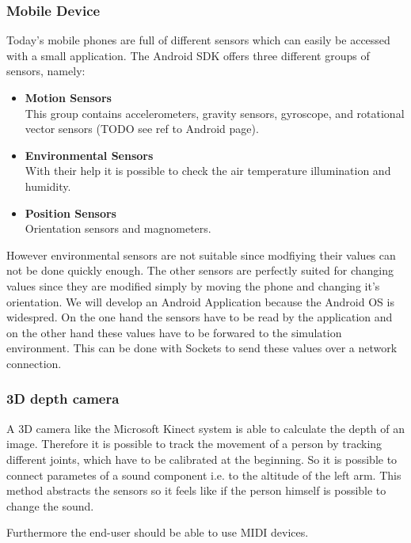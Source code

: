 \subsubsection{Mobile Device}
Today's mobile phones are full of different sensors which can easily be accessed with a small application. The Android SDK offers three different groups of sensors, namely:
\begin{itemize}
	\item \textbf{Motion Sensors} \\
			This group contains accelerometers, gravity sensors, gyroscope, and rotational vector sensors (TODO see ref to Android page). 
	\item \textbf{Environmental Sensors} \\
			With their help it is possible to check the air temperature illumination and humidity.
	\item \textbf{Position Sensors} \\
			Orientation sensors and magnometers.
\end{itemize}

However environmental sensors are not suitable since modfiying their values can not be done quickly enough. The other sensors are perfectly suited for changing values since they are modified simply by moving the phone and changing it's orientation. We will develop an Android Application because the Android OS is widespred. On the one hand the sensors have to be read by the application and on the other hand these values have to be forwared to the simulation environment. This can be done with Sockets to send these values over a network connection.

\subsubsection{3D depth camera}
A 3D camera like the Microsoft Kinect system is able to calculate the depth of an image. Therefore it is possible to track the movement of a person by tracking different joints, which have to be calibrated at the beginning. So it is possible to connect parametes of a sound component i.e. to the altitude of the left arm. This method abstracts the sensors so it feels like if the person himself is possible to change the sound.

Furthermore the end-user should be able to use MIDI devices.

